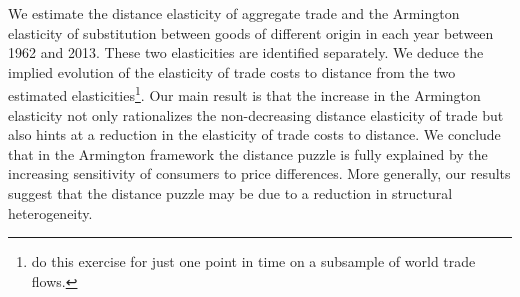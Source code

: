 \documentclass[12pt,twoside,a4paper,notitlepage]{article}
\begin{document}
We estimate the distance elasticity of aggregate trade and the Armington elasticity of substitution between goods of different origin in each year between 1962 and 2013. These two elasticities are identified separately. We deduce the implied evolution of the elasticity of trade costs to distance from the two estimated elasticities\footnote{\cite{Erkel-Rousse2002} do this exercise for just one point in time on a subsample of world trade flows.}.
Our main result is that the increase in the Armington elasticity not only rationalizes the non-decreasing distance elasticity of trade but also hints at a reduction in the elasticity of trade costs to distance. We conclude that in the Armington framework the distance puzzle is fully explained by the increasing sensitivity of consumers to price differences. More generally, our results suggest that the distance puzzle may be due to a reduction in structural heterogeneity.
\end{document}
